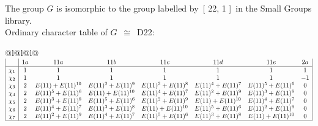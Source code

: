 \documentclass[varwidth=\maxdimen,border=10]{standalone}
\begin{document}
The group $G$ is isomorphic to the group labelled by\ [ 22, 1 ]\ in the Small Groups library.\\
Ordinary character table of $G$\ $\cong$\ D22:\\
\begin{center}
\begin{tabular}{@{}l@{}l@{}l@{}}
\hline
\(\begin{array}{|l|ccccccc|}
  & 1a & 11a & 11b & 11c & 11d & 11e & 2a\\ \hline
\chi_{1} & 1 & 1 & 1 & 1 & 1 & 1 & 1\\
\chi_{2} & 1 & 1 & 1 & 1 & 1 & 1 & -1\\
\chi_{3} & 2 & E(11)+E(11)^{10} & E(11)^{2}+E(11)^{9} & E(11)^{3}+E(11)^{8} & E(11)^{4}+E(11)^{7} & E(11)^{5}+E(11)^{6} & 0\\
\chi_{4} & 2 & E(11)^{5}+E(11)^{6} & E(11)+E(11)^{10} & E(11)^{4}+E(11)^{7} & E(11)^{2}+E(11)^{9} & E(11)^{3}+E(11)^{8} & 0\\
\chi_{5} & 2 & E(11)^{3}+E(11)^{8} & E(11)^{5}+E(11)^{6} & E(11)^{2}+E(11)^{9} & E(11)+E(11)^{10} & E(11)^{4}+E(11)^{7} & 0\\
\chi_{6} & 2 & E(11)^{4}+E(11)^{7} & E(11)^{3}+E(11)^{8} & E(11)+E(11)^{10} & E(11)^{5}+E(11)^{6} & E(11)^{2}+E(11)^{9} & 0\\
\chi_{7} & 2 & E(11)^{2}+E(11)^{9} & E(11)^{4}+E(11)^{7} & E(11)^{5}+E(11)^{6} & E(11)^{3}+E(11)^{8} & E(11)+E(11)^{10} & 0\\
\hline
\end{array}\)\\
\end{tabular}
\end{center}
\end{document}
